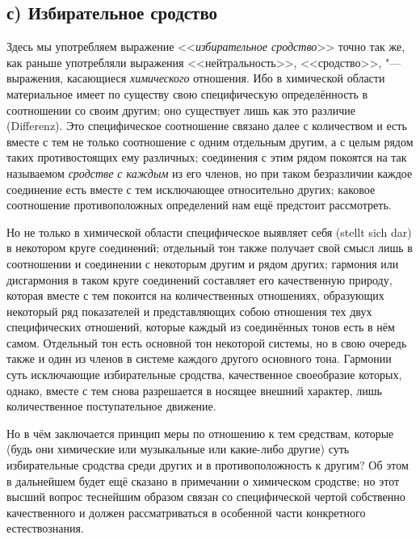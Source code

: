 \subsection[с) Избирательное сродство]{с) Избирательное сродство}

Здесь мы употребляем выражение <<{\em избирательное сродство}>> точно так же,
как раньше употребляли выражения <<нейтральность>>, <<сродство>>, "---
выражения, касающиеся {\em химического} отношения. Ибо в химической области
материальное имеет по существу свою специфическую определённость в соотношении
со своим другим; оно существует лишь как это различие (Diffe\-renz). Это
специфическое соотношение связано далее с количеством и есть вместе с тем не
только соотношение с одним отдельным другим, а с целым рядом таких
противостоящих ему различных; соединения с этим рядом покоятся на так
называемом {\em сродстве с каждым} из его членов, но при таком безразличии
каждое соединение есть вместе с тем исключающее относительно других; каковое
соотношение противоположных определений нам ещё предстоит рассмотреть.

Но не только в химической области специфическое выявляет себя (stellt sich dar)
в некотором круге соединений; отдельный тон также получает свой смысл лишь в
соотношении и соединении с некоторым другим и рядом других; гармония или
дисгармония в таком круге соединений составляет его качественную природу,
которая вместе с тем покоится на количественных отношениях, образующих
некоторый ряд показателей и представляющих собою отношения тех двух
специфических отношений, которые каждый из соединённых тонов есть в нём самом.
Отдельный тон есть основной тон некоторой системы, но в свою очередь также и
один из членов в системе каждого другого основного тона. Гармонии суть
исключающие избирательные сродства, качественное своеобразие которых, однако,
вместе с тем снова разрешается в носящее внешний характер, лишь количественное
поступательное движение.

Но в чём заключается принцип меры по отношению к тем средствам, которые (будь
они химические или музыкальные или какие-либо другие) суть избирательные
сродства среди других и в противоположность к другим? Об этом в дальнейшем
будет ещё сказано в примечании о химическом сродстве; но этот высший вопрос
теснейшим образом связан со специфической чертой собственно качественного и
должен рассматриваться в особенной части конкретного естествознания.

